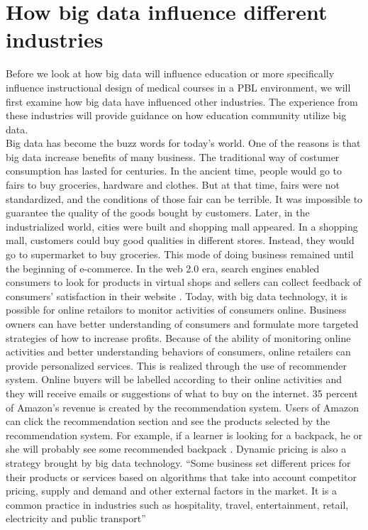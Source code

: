\documentclass[sigconf]{acmart}
\begin{document}
\section{How big data influence different industries}
Before we look at how big data will influence education or more specifically influence instructional design of medical courses in a PBL environment, we will first examine how big data have influenced other industries. The experience from these industries will provide guidance on how education community utilize big data.\\
Big data has become the buzz words for today's world. One of the reasons is that big data increase benefits of many business. The traditional way of costumer consumption has lasted for centuries. In the ancient time, people would go to fairs to buy groceries, hardware and clothes. But at that time, fairs were not standardized, and the conditions of those fair can be terrible. It was impossible to guarantee the quality of the goods bought by customers. Later, in the industrialized world, cities were built and shopping mall appeared. In a shopping mall, customers could buy good qualities in different stores. Instead, they would go to supermarket to buy groceries. This mode of doing business remained until the beginning of e-commerce. In the web 2.0 era, search engines enabled consumers to look for products in virtual shops and sellers can collect feedback of consumers' satisfaction in their website \cite{Chen2012}. Today, with big data technology, it is possible for online retailors to monitor activities of consumers online. Business owners can have better understanding of consumers and formulate more targeted strategies of how to increase profits. Because of the ability of monitoring online activities and better understanding behaviors of consumers, online retailers can provide personalized services. This is realized through the use of recommender system. Online buyers will be labelled according to their online activities and they will receive emails or suggestions of what to buy on the internet. 35 percent of Amazon's revenue is created by the recommendation system. Users of Amazon can click the recommendation section and see the products selected by the recommendation system. For example, if a learner is looking for a backpack, he or she will probably see some recommended backpack \cite{Krawiec2017}. Dynamic pricing is also a strategy brought by big data technology. ``Some business set different prices for their products or services based on algorithms that take into account competitor pricing, supply and demand and other external factors in the market. It is a common practice in industries such as hospitality, travel, entertainment, retail, electricity and public transport'' \cite{Wikipedia2017}\\
\end{document}
